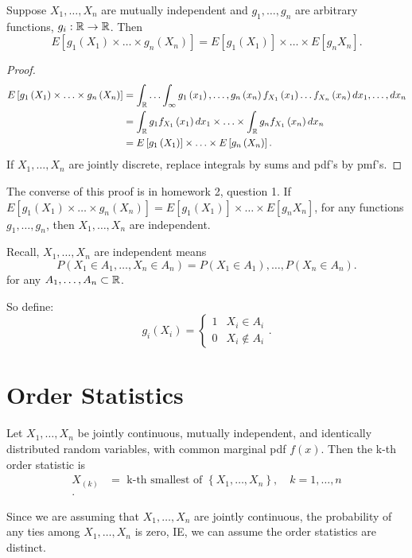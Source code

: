 
Suppose $X_{1} , \ldots , X_{n}$ are mutually independent and $g_{1} , \ldots , g_{n}$ are arbitrary functions, $g_{i} : \mathbb{R} \to \mathbb{R}$. Then 
\[
	E\left[ g_1 \left( X_1 \right)  \times \ldots\times g_{n}\left( X_{n} \right)  \right] = E\left[ g_1 \left( X_1 \right)  \right] \times  \ldots \times E\left[ g_{n}X_{n} \right] 
.\]
\begin{proof}
	\begin{align*}
		E\left[ g_1 \left( X_1 \right)  \times \ldots\times g_{n}\left( X_{n} \right)  \right] &= 
		\int_{\mathbb{R}}^{ } \ldots \int_{\infty}^{ }  g_{1}\left( x_1 \right)  , \ldots , g_{n}\left( x_{n} \right)  f_{X_1}\left( x_{1} \right) \ldots f_{X_{n}}\left( x_{n} \right) dx_{1} , \ldots , dx_{n} \\
												       &= \int_{\mathbb{R}}^{ } g_1 f_{X_1}\left( x_1 \right) dx_1\times  \ldots\times  \int_{\mathbb{R}}^{ } g_{n}f_{X_1}\left( x_{n} \right) dx_{n}    \\
												       &= E\left[ g_1 \left( X_1 \right)  \right] \times \ldots \times E\left[ g_n \left( X_{n} \right)  \right]  
	.\end{align*} 
	If $X_1 , \ldots, X_{n}$ are jointly discrete, replace integrals by sums and pdf's by pmf's.
\end{proof}

The converse of this proof is in homework 2, question 1. If $E\left[ g_1 \left( X_1 \right)  \times \ldots\times g_{n}\left( X_{n} \right)  \right] = E\left[ g_1 \left( X_1 \right)  \right] \times  \ldots \times E\left[ g_{n}X_{n} \right]$, for any functions $g_{1} , \ldots , g_{n}$, then $X_{1} , \ldots , X_{n}$ are independent. 

Recall, $X_{1} , \ldots , X_{n}$ are independent means 
\[
	P\left( X_1 \in  A_1, \ldots, X_{n} \in  A_{n} \right) = P\left( X_{1} \in  A_1  \right), \ldots, P\left( X_{n} \in  A_n \right)  
.\] 
for any $A_{1} , \ldots , A_{n} \subset  \mathbb{R}$.

So define:
\[
g_{i}\left( X_{i} \right)  = \begin{cases}
	1 & X_{i} \in  A_{i}\\
	0 & X_{i }\not \in A_{i}
\end{cases}
.\] 

\section{Order Statistics}

Let $X_{1} , \ldots , X_{n}$ be jointly continuous, mutually independent, and identically distributed random variables, with common marginal pdf $f\left( x \right) $. Then the k-th order statistic is 
\begin{align*}
	X_{\left( k \right) } &= \text{ k-th smallest of }\left\{ X_{1} , \ldots , X_{n} \right\}  , \quad k = 1, \ldots, n\\
.\end{align*}
\begin{remark}
	Since we are assuming that $X_{1} , \ldots , X_{n}$ are jointly continuous, the probability of any ties among $X_{1} , \ldots , X_{n}$ is zero, IE, we can assume the order statistics are distinct. 
\end{remark}

